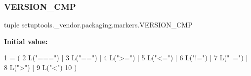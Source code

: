 \subsubsection{\texorpdfstring{V\+E\+R\+S\+I\+O\+N\+\_\+\+C\+MP}{VERSION\_CMP}}
{\footnotesize\ttfamily tuple setuptools.\+\_\+vendor.\+packaging.\+markers.\+V\+E\+R\+S\+I\+O\+N\+\_\+\+C\+MP}

{\bfseries Initial value\+:}
\begin{DoxyCode}
1 =  (
2     L(\textcolor{stringliteral}{"==="}) |
3     L(\textcolor{stringliteral}{"=="}) |
4     L(\textcolor{stringliteral}{">="}) |
5     L(\textcolor{stringliteral}{"<="}) |
6     L(\textcolor{stringliteral}{"!="}) |
7     L(\textcolor{stringliteral}{"~="}) |
8     L(\textcolor{stringliteral}{">"}) |
9     L(\textcolor{stringliteral}{"<"})
10 )
\end{DoxyCode}
